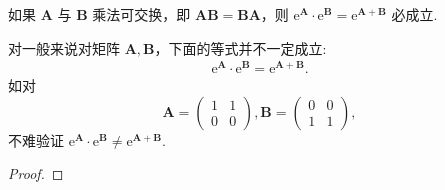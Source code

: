 \documentclass[../../main.tex]{subfiles}
\begin{document}
\begin{proposition}\label{proposition:矩阵乘法可交换必成立e^A乘e^B=e^A+B}
如果 $\boldsymbol{A}$ 与 $\boldsymbol{B}$ 乘法可交换，即 $\boldsymbol{A}\boldsymbol{B}=\boldsymbol{B}\boldsymbol{A}$，则 $\mathrm{e}^{\boldsymbol{A}}\cdot\mathrm{e}^{\boldsymbol{B}}=\mathrm{e}^{\boldsymbol{A}+\boldsymbol{B}}$ 必成立.
\end{proposition}
\begin{remark}
对一般来说对矩阵 $\boldsymbol{A},\boldsymbol{B}$，下面的等式并不一定成立:
\begin{align*}
\mathrm{e}^{\boldsymbol{A}}\cdot\mathrm{e}^{\boldsymbol{B}}=\mathrm{e}^{\boldsymbol{A}+\boldsymbol{B}}.
\end{align*}
如对
\[
\boldsymbol{A}=\begin{pmatrix}
1 & 1 \\
0 & 0
\end{pmatrix}, \boldsymbol{B}=\begin{pmatrix}
0 & 0 \\
1 & 1
\end{pmatrix},
\]
不难验证 $\mathrm{e}^{\boldsymbol{A}}\cdot\mathrm{e}^{\boldsymbol{B}}\neq\mathrm{e}^{\boldsymbol{A}+\boldsymbol{B}}$. 
\end{remark}
\begin{proof}

\end{proof}
\end{document}
